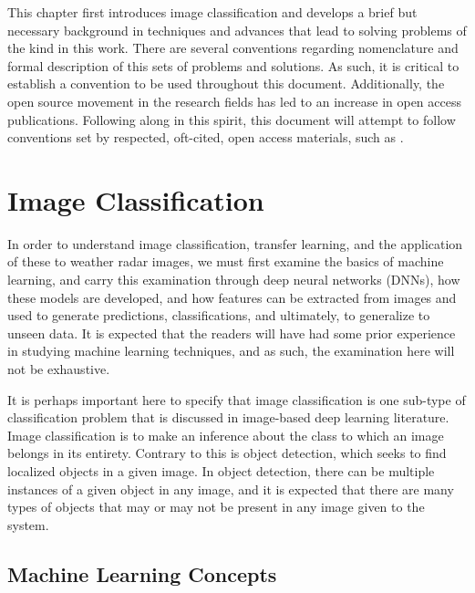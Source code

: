 This chapter first introduces image classification and develops a brief but necessary background in techniques and advances that lead to solving problems of the kind in this work.
There are several conventions regarding nomenclature and formal description of this sets of problems and solutions.
As such, it is critical to establish a convention to be used throughout this document.
Additionally, the open source movement in the research fields has led to an increase in open access publications.
Following along in this spirit, this document will attempt to follow conventions set by respected, oft-cited, open access materials, such as \cite{goodfellow2016}.

\section{Image Classification}
\label{sec:classifying_image}

In order to understand image classification, transfer learning, and the application of these to weather radar images, we must first examine the basics of machine learning, and carry this examination through deep neural networks (DNNs), how these models are developed, and how features can be extracted from images and used to generate predictions, classifications, and ultimately, to generalize to unseen data. 
It is expected that the readers will have had some prior experience in studying machine learning techniques, and as such, the examination here will not be exhaustive. 

It is perhaps important here to specify that image classification is one sub-type of classification problem that is discussed in image-based deep learning literature.
Image classification is to make an inference about the class to which an image belongs in its entirety. 
Contrary to this is object detection, which seeks to find localized objects in a given image.
In object detection, there can be multiple instances of a given object in any image, and it is expected that there are many types of objects that may or may not be present in any image given to the system.


\subsection{Machine Learning Concepts}
\label{ssec:classifying_concepts}

